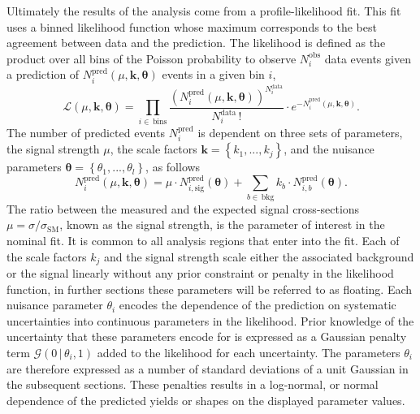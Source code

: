 Ultimately the results of the analysis come from a profile-likelihood fit. This
fit uses a binned likelihood function whose maximum corresponds to the best
agreement between data and the prediction. The likelihood is defined as the
product over all bins of the Poisson probability to observe $N^{\text{obs}}_i$ data
events given a prediction of $N^{\text{pred}}_i(\mu,\bm{k},{\bm\theta})$
events in a given bin $i$,
\begin{equation}
  \mathcal{L}(\mu,{\bm{k},\bm{\theta}}) =
  \prod_{i\in\,\text{bins}} \frac{\left( N_{i}^{\text{pred}}(\mu,{\bm{k,\theta}})
    \right)^{N_{i}^{\text{data}}}}{N_{i}^{\text{data}}\,!}
  \cdot e^{-N_{i}^{\text{pred}}(\mu,{\bm{k,\theta}})}.
  \label{eq:likelihood}
\end{equation}
The number of predicted events $N^{\text{pred}}_i$  is dependent on three sets of
parameters, the signal strength $\mu$, the scale factors $\bm{k}=\left\{k_1,
  ...,k_j\right\}$, and the nuisance parameters  $\bm{\theta} =
\left\{\theta_1,...,\theta_l\right\}$, as follows
\begin{equation}
  N_{i}^{\text{pred}}(\mu,\bm{k},\bm{\theta}) =
  \mu \cdot N_{i,\text{sig}}^{\text{pred}}(\bm{\theta}) +
  \sum_{b\in\,\text{bkg}} k_b\cdot N_{i,b}^{\text{pred}}(\bm{\theta}).
\end{equation}
The ratio between the measured and the expected signal cross-sections
$\mu=\sigma/\sigma_{\text{SM}}$, known as the signal strength, is the parameter
of interest in the nominal fit. It is common to all analysis regions that enter
into the fit. Each of the scale factors $k_j$ and the signal strength scale
either the associated background or the signal linearly without any prior
constraint or penalty in the likelihood function, in further sections these
parameters will be referred to as floating. Each nuisance parameter $\theta_i$
encodes the dependence of the prediction on systematic uncertainties into
continuous parameters in the likelihood. Prior knowledge of the uncertainty that
these parameters encode for is expressed as a Gaussian penalty term
$\mathcal{G}(0\,|\,\theta_i,1)$ added to the likelihood for each uncertainty.
The parameters $\theta_i$ are therefore expressed as a number of standard
deviations of a unit Gaussian in the subsequent sections. These penalties
results in a log-normal, or normal dependence of the predicted yields or shapes
on the displayed parameter values.


